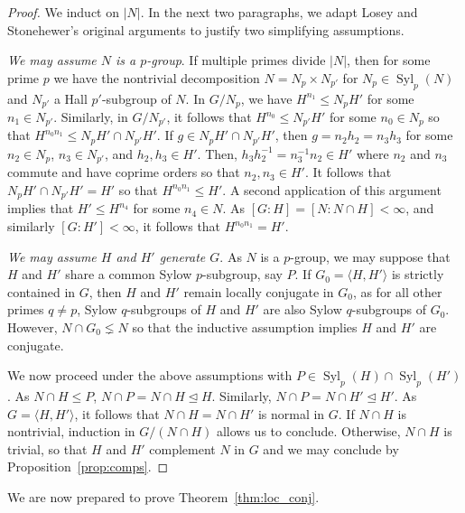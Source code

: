 \documentclass{amsart}
\theoremstyle{definition}
\theoremstyle{remark}
\numberwithin{equation}{section}
\newcommand{\normal}{\trianglelefteq}
\providecommand{\abs}[1]{\ensuremath{\lvert#1\rvert}}
\DeclareMathOperator{\Syl}{Syl}
\begin{document}
\begin{proof}
	We induct on $\abs{N}$. In the next two paragraphs, we adapt Losey and Stonehewer's original arguments to justify two simplifying assumptions.

	\emph{We may assume $N$ is a $p$-group}. If multiple primes divide $\abs{N}$, then for some prime $p$ we have the nontrivial decomposition $N=N_p \times N_{p'}$ for $N_p\in \Syl_p(N)$ and $N_{p'}$ a Hall $p'$-subgroup of $N$. In $G/N_p$, we have $H^{n_1} \leq N_p H'$ for some $n_1 \in N_{p'}$. Similarly, in $G/N_{p'}$, it follows that $H^{n_0} \leq N_{p'}H'$ for some $n_0 \in N_p$ so that $H^{n_0n_1} \leq N_pH' \cap N_{p'}H'$. If $g \in  N_pH' \cap N_{p'}H'$, then $g = n_2h_2 = n_3h_3$ for some $n_2 \in N_p$, $n_3 \in N_{p'}$, and $h_2, h_3 \in H'$. Then, $h_3h_2^{-1}=n_3^{-1}n_2 \in H'$ where $n_2$ and $n_3$ commute and have coprime orders so that $n_2, n_3 \in H'$. It follows that $N_pH' \cap N_{p'}H' = H'$ so that $H^{n_0n_1} \leq H'$. A second application of this argument implies that $H' \leq H^{n_4}$ for some $n_4\in N$. As $[G:H] = [N: N\cap H] < \infty$, and similarly $[G:H']<\infty$, it follows that $H^{n_0n_1} = H'$.

	\emph{We may assume $H$ and $H'$ generate $G$}. As $N$ is a $p$-group, we may suppose that $H$ and $H'$ share a common Sylow $p$-subgroup, say $P$. If $G_0 = \langle H, H' \rangle$ is strictly contained in $G$, then $H$ and $H'$ remain locally conjugate in $G_0$, as for all other primes $q\ne p$, Sylow $q$-subgroups of $H$ and $H'$ are also Sylow $q$-subgroups of $G_0$. However, $N\cap G_0 \lneq N$ so that the inductive assumption implies $H$ and $H'$ are conjugate.

	We now proceed under the above assumptions with $P \in \Syl_p(H) \cap \Syl_p(H')$. As $N\cap H \leq P$, $N \cap P = N \cap H \normal H$. Similarly, $N \cap P = N \cap H' \normal H'$. As $G=\langle H, H' \rangle$, it follows that $N\cap H = N \cap H'$ is normal in $G$. If $N\cap H$ is nontrivial, induction in $G/(N\cap H)$ allows us to conclude. Otherwise, $N\cap H$ is trivial, so that $H$ and $H'$ complement $N$ in $G$ and we may conclude by Proposition~\ref{prop:comps}.
\end{proof}

We are now prepared to prove Theorem~\ref{thm:loc_conj}.
\end{document}

